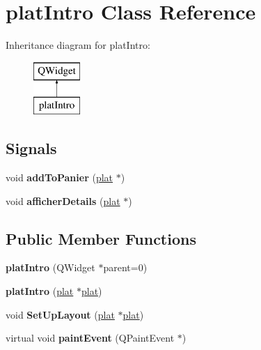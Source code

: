 \hypertarget{classplat_intro}{}\section{plat\+Intro Class Reference}
\label{classplat_intro}
Inheritance diagram for plat\+Intro\+:\begin{figure}[H]
\begin{center}
\leavevmode
\includegraphics[height=2.000000cm]{classplat_intro}
\end{center}
\end{figure}
\subsection*{Signals}
\begin{DoxyCompactItemize}
\item 
void {\bfseries add\+To\+Panier} (\hyperlink{classplat}{plat} $\ast$)\hypertarget{classplat_intro_a644b0ffab5e616c74b4dc1f8c39456ce}{}\label{classplat_intro_a644b0ffab5e616c74b4dc1f8c39456ce}

\item 
void {\bfseries afficher\+Details} (\hyperlink{classplat}{plat} $\ast$)\hypertarget{classplat_intro_ad38a159413cf4f59d253fa33d5d230ff}{}\label{classplat_intro_ad38a159413cf4f59d253fa33d5d230ff}

\end{DoxyCompactItemize}
\subsection*{Public Member Functions}
\begin{DoxyCompactItemize}
\item 
{\bfseries plat\+Intro} (Q\+Widget $\ast$parent=0)\hypertarget{classplat_intro_a4db615d8dfa4a0ad020d88a36d954f27}{}\label{classplat_intro_a4db615d8dfa4a0ad020d88a36d954f27}

\item 
{\bfseries plat\+Intro} (\hyperlink{classplat}{plat} $\ast$\hyperlink{classplat}{plat})\hypertarget{classplat_intro_a4b5c0582a5ba0f0a22b2b2956c21285e}{}\label{classplat_intro_a4b5c0582a5ba0f0a22b2b2956c21285e}

\item 
void {\bfseries Set\+Up\+Layout} (\hyperlink{classplat}{plat} $\ast$\hyperlink{classplat}{plat})\hypertarget{classplat_intro_a075ae379eb15b767b3323f68b0d8f92c}{}\label{classplat_intro_a075ae379eb15b767b3323f68b0d8f92c}

\item 
virtual void {\bfseries paint\+Event} (Q\+Paint\+Event $\ast$)\hypertarget{classplat_intro_a3b164a28da5ee049e724a36c5256e684}{}\label{classplat_intro_a3b164a28da5ee049e724a36c5256e684}

\end{DoxyCompactItemize}

